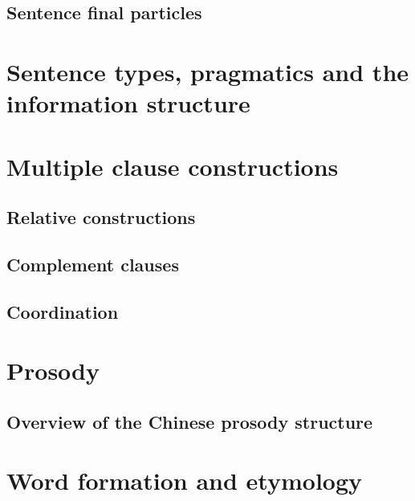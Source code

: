 \documentclass[UTF8, a4paper, oneside, scheme=plain]{ctexbook}
\numberwithin{equation}{chapter}
\begin{document}


\chapter{Sentence final particles}





\part{Sentence types, pragmatics and the information structure}%

\part{Multiple clause constructions}

\chapter{Relative constructions}\label{chap:relative}

\chapter{Complement clauses}\label{chap:comp-clause}

\chapter{Coordination}

\part{Prosody}

\chapter{Overview of the Chinese prosody structure}\label{chap:prosody-overview}

\part{Word formation and etymology}





\printindex
\end{document}
